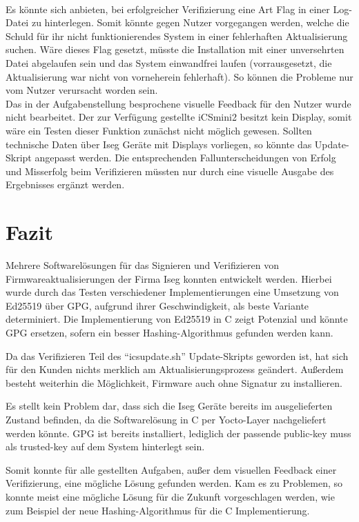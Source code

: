 \documentclass[thesis=bachelor,faculty=cb]{hsmw-thesis}
\begin{document}
{\\[1cm]
Es könnte sich anbieten, bei erfolgreicher Verifizierung eine Art Flag in einer Log-Datei zu hinterlegen. Somit könnte gegen Nutzer vorgegangen werden, welche die Schuld für ihr nicht funktionierendes System in einer fehlerhaften Aktualisierung suchen. Wäre dieses Flag gesetzt, müsste die Installation mit einer unversehrten Datei abgelaufen sein und das System einwandfrei laufen (vorrausgesetzt, die Aktualisierung war nicht von vorneherein fehlerhaft).
So können die Probleme nur vom Nutzer verursacht worden sein.
\\[1cm]
Das in der Aufgabenstellung besprochene visuelle Feedback für den Nutzer wurde nicht bearbeitet. Der zur Verfügung gestellte iCSmini2 besitzt kein Display, somit wäre ein Testen dieser Funktion zunächst nicht möglich gewesen. Sollten technische Daten über Iseg Geräte mit Displays vorliegen, so könnte das Update-Skript angepasst werden. Die entsprechenden Fallunterscheidungen von Erfolg und Misserfolg beim Verifizieren müssten nur durch eine visuelle Ausgabe des Ergebnisses ergänzt werden.
\section{Fazit}
Mehrere Softwarelösungen für das Signieren und Verifizieren von Firmwareaktualisierungen der Firma Iseg konnten entwickelt werden.
Hierbei wurde durch das Testen verschiedener Implementierungen eine Umsetzung von Ed25519 über GPG, aufgrund ihrer Geschwindigkeit, als beste Variante determiniert.
Die Implementierung von Ed25519 in C zeigt Potenzial und könnte GPG ersetzen, sofern ein besser Hashing-Algorithmus gefunden werden kann.

Da das Verifizieren Teil des \enquote{icsupdate.sh} Update-Skripts geworden ist, hat sich für den Kunden nichts merklich am Aktualisierungsprozess geändert. Außerdem besteht weiterhin die Möglichkeit, Firmware auch ohne Signatur zu installieren.

Es stellt kein Problem dar, dass sich die Iseg Geräte bereits im ausgelieferten Zustand befinden, da die Softwarelösung in C per Yocto-Layer nachgeliefert werden könnte. GPG ist bereits installiert, lediglich der passende public-key muss als trusted-key auf dem System hinterlegt sein.

Somit konnte für alle gestellten Aufgaben, außer dem visuellen Feedback einer Verifizierung, eine mögliche Lösung gefunden werden. Kam es zu Problemen, so konnte meist eine mögliche Lösung für die Zukunft vorgeschlagen werden, wie zum Beispiel der neue Hashing-Algorithmus für die C Implementierung.
}
\end{document}
